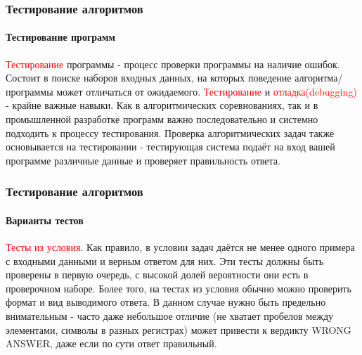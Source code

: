 \documentclass[aspectratio=169]{beamer}
\begin{document}
\begin{frame}
\frametitle{Тестирование алгоритмов}
\framesubtitle{Тестирование программ}
\justifying
\textcolor{red}{Тестирование} программы - процесс проверки программы на наличие ошибок. Состоит в поиске наборов входных данных, на которых поведение алгоритма/программы может отличаться от ожидаемого. \textcolor{red}{Тестирование} и \textcolor{red}{отладка(debugging)} - крайне важные навыки.\newline\newline
Как в алгоритмических соревнованиях, так и в промышленной разработке программ важно последовательно и системно подходить к процессу тестирования.\newline\newline
Проверка алгоритмических задач также основывается на тестировании - тестирующая система подаёт на вход вашей программе различные данные и проверяет правильность ответа.

\end{frame}

\begin{frame}
\frametitle{Тестирование алгоритмов}
\framesubtitle{Варианты тестов}
\justifying
\textcolor{red}{Тесты из условия}. Как правило, в условии задач даётся не менее одного примера с входными данными и верным ответом для них. Эти тесты должны быть проверены в первую очередь, с высокой долей вероятности они есть в проверочном наборе. \newline\newline
Более того, на тестах из условия обычно можно проверить формат и вид выводимого ответа. В данном случае нужно быть предельно внимательным - часто даже небольшое отличие (не хватает пробелов между элементами, символы в разных регистрах) может привести к вердикту WRONG ANSWER, даже если по сути ответ правильный.
\begin{figure}
    \captionsetup[subfigure]{labelformat=empty}
    \centering
\end{figure}
\end{frame}
\end{document}
